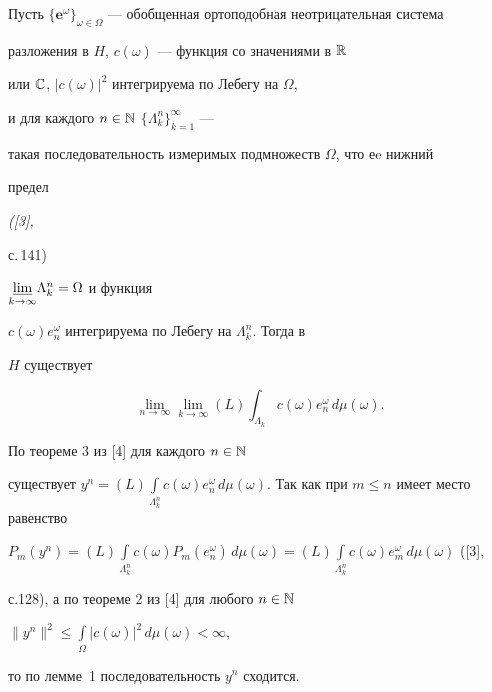 \begin{thm}\hspace{-1.8mm}{\bf.}


Пусть $\{\boldsymbol e^\omega\}_{\omega\in


\Omega}$ --- обобщенная ортоподобная неотрицательная система


разложения в $H$, $c(\omega)$ --- функция со значениями в $\Bbb R$


или $\Bbb C$, $|c(\omega)|^2$ интегрируема по Лебегу на $\Omega$,


и для каждого $n\in\Bbb N$\; $\{\Lambda^n_k\}^\infty_{k=1}$ ---


такая последовательность измеримых подмножеств $\Omega$, что еe нижний


предел {\em ([3],


с.\,141)} $\underset{k\to \infty}{\varliminf}{\Lambda^n_k}=\Omega$ и функция


$c(\omega)e_n^\omega$ интегрируема по Лебегу на $\Lambda^n_k$. Тогда в


$H$ существует


\begin{equation}


\lim_{n\to\infty}\lim_{k\to\infty}(L)\int_{\Lambda_k}c(\omega


)e_n^\omega\,d\mu(\omega).


\end{equation}


\end{thm}





\begin{pf}


По теореме 3 из [4] для каждого $n\in\Bbb N$


существует $y^n=(L)\int\limits_{\Lambda^n_k}c(\omega)e_n^\omega\,


d\mu(\omega)$. Так как при $m\leqslant n$ имеет место равенство


$P_m(y^n)=(L)\int\limits_{\Lambda^n_k}c(\omega)P_m(e_n^\omega)\,d\mu(\omega)


=(L)\int\limits_{\Lambda^n_k}c(\omega)e_m^\omega\,d\mu(\omega)$ ([3],


с.128), а по теореме 2 из [4] для любого $n\in\Bbb N$\;


$\|y^n\|^2\leqslant\int\limits_\Omega|c(\omega)|^2\,d\mu(\omega)<\infty$,


то по лемме~1 последовательность $y^n$ сходится.


\end{pf}






